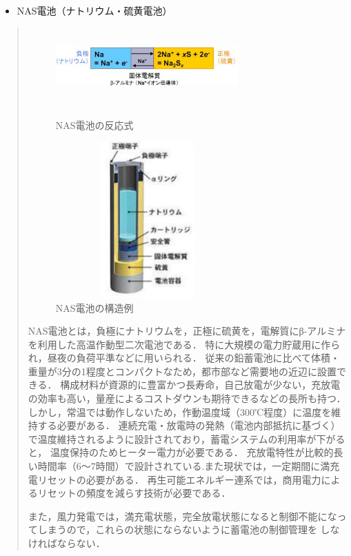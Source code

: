 \documentclass[a4paper,12pt,showkeys]{jreport}
\begin{document}
\begin{itemize}
\item NAS電池（ナトリウム・硫黄電池）
\end{itemize}
\begin{quotation}

\begin{figure}[h]
 \begin{minipage}{0.5\hsize}
  \begin{center}
   \includegraphics[width=7cm, height=3cm, clip]{nas1.eps}
  \end{center}
  \caption{NAS電池の反応式\cite{蓄電池}}
  \label{fig:one}
 \end{minipage}
 \begin{minipage}{0.5\hsize}
  \begin{center}
   \includegraphics[width=7cm,height=6cm, clip]{nas2.eps}
  \end{center}
  \caption{NAS電池の構造例\cite{蓄電池}}
  \label{fig:two}
 \end{minipage}
\end{figure}

NAS電池とは，負極にナトリウムを，正極に硫黄を，電解質にβ-アルミナを利用した高温作動型二次電池である．
特に大規模の電力貯蔵用に作られ，昼夜の負荷平準などに用いられる．
従来の鉛蓄電池に比べて体積・重量が3分の1程度とコンパクトなため，都市部など需要地の近辺に設置できる．
構成材料が資源的に豊富かつ長寿命，自己放電が少ない，充放電の効率も高い，量産によるコストダウンも期待できるなどの長所も持つ．
しかし，常温では動作しないため，作動温度域（300℃程度）に温度を維持する必要がある．
連続充電・放電時の発熱（電池内部抵抗に基づく）で温度維持されるように設計されており，蓄電システムの利用率が下がると，
温度保持のためヒーター電力が必要である．
充放電特性が比較的長い時間率（6～7時間）で設計されている.また現状では，一定期間に満充電リセットの必要がある．
再生可能エネルギー連系では，商用電力によるリセットの頻度を減らす技術が必要である．

また，風力発電では，満充電状態，完全放電状態になると制御不能になってしまうので，これらの状態にならないように蓄電池の制御管理を
しなければならない\cite{蓄電池}．

\end{quotation}
\end{document}
